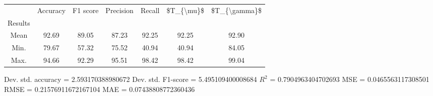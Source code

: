 \begin{tabular}{|c|c|c|c|c|c|c|}
\toprule
{} &  Accuracy &  F1 score &  Precision &  Recall &  \$T\_\{\textbackslash mu\}\$ &  \$T\_\{\textbackslash gamma\}\$ \\
Results &           &           &            &         &            &               \\
\hline
Mean    &     92.69 &     89.05 &      87.23 &   92.25 &      92.25 &         92.90 \\
Min.    &     79.67 &     57.32 &      75.52 &   40.94 &      40.94 &         84.05 \\
Max.    &     94.66 &     92.29 &      95.51 &   98.42 &      98.42 &         99.04 \\
\bottomrule
\end{tabular}

 Dev. std. accuracy = 2.593170388980672
 Dev. std. F1-score = 5.495109400008684
 $R^2$ = 0.7904963404702693
 MSE = 0.0465563117308501
 RMSE = 0.21576911672167104
 MAE = 0.07438808772360436